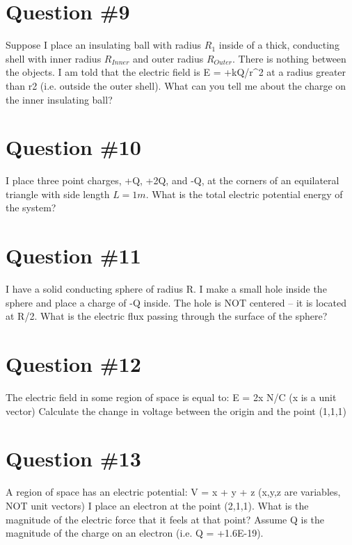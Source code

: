 \documentclass[12pt]{article}
\begin{document}
\section*{Question \#9}
Suppose I place an insulating ball with radius $R_1$ inside of a thick, conducting shell with inner radius $R_{Inner}$ and outer radius $R_{Outer}$.  There is nothing between the objects.  I am told that the electric field is E = +kQ/r^2 at a radius greater than r2 (i.e. outside the outer shell).  What can you tell me about the charge on the inner insulating ball?

\section*{Question \#10}
I place three point charges, +Q, +2Q, and -Q, at the corners of an equilateral triangle with side length $L = 1 m$.  What is the total electric potential energy of the system?

\section*{Question \#11}
I have a solid conducting sphere of radius R.  I make a small hole inside the sphere and place a charge of -Q inside.  The hole is NOT centered – it is located at R/2.  
What is the electric flux passing through the surface of the sphere?

\section*{Question \#12}
The electric field in some region of space is equal to:
E = 2x N/C (x is a unit vector)
Calculate the change in voltage between the origin and the point (1,1,1)

\section*{Question \#13}
A region of space has an electric potential:
V = x + y + z (x,y,z are variables, NOT unit vectors)
I place an electron at the point (2,1,1).  What is the magnitude of the electric force that it feels at that point?  Assume Q is the magnitude of the charge on an electron (i.e. Q = +1.6E-19).
\end{document}
